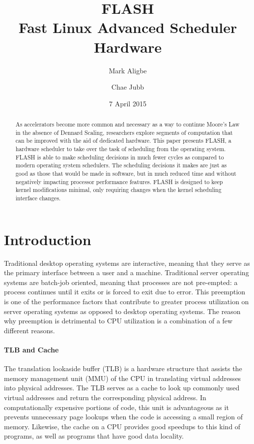 \documentclass{sig-alternate-10pt}
\title{FLASH\\Fast Linux Advanced Scheduler Hardware}
\author{
	Mark Aligbe \\
	    \email{ma2799@columbia.edu}
	\and
    Chae Jubb \\
        \email{ecj2122@columbia.edu}
}
\date{7 April 2015}
\begin{document}
\maketitle

\begin{abstract}

As accelerators become more common and necessary as a way to continue Moore's Law in the absence of Dennard Scaling, researchers explore segments of computation that can be improved with the aid of dedicated hardware. This paper presents FLASH, a hardware scheduler to take over the task of scheduling from the operating system. FLASH is able to make scheduling decisions in much fewer cycles as compared to modern operating system schedulers. The scheduling decisions it makes are just as good as those that would be made in software, but in much reduced time and without negatively impacting processor performance features. FLASH is designed to keep kernel modifications minimal, only requiring changes when the kernel scheduling interface changes.
\end{abstract}


\section{Introduction}
Traditional desktop operating systems are interactive, meaning that they serve as the primary interface between a user and a machine. Traditional server operating systems are batch-job oriented, meaning that processes are not pre-empted: a process continues until it exits or is forced to exit due to error. This preemption is one of the performance factors that contribute to greater process utilization on server operating systems as opposed to desktop operating systems. The reason why preemption is detrimental to CPU utilization is a combination of a few different reasons.

\paragraph{TLB and Cache}
The translation lookaside buffer (TLB) is a hardware structure that assists the memory management unit (MMU) of the CPU in translating virtual addresses into physical addresses. The TLB serves as a cache to look up commonly used virtual addresses and return the corresponding physical address. In computationally expensive portions of code, this unit is advantageous as it prevents unnecessary page lookups when the code is accessing a small region of memory. Likewise, the cache on a CPU provides good speedups to this kind of programs, as well as programs that have good data locality.
\end{document}

